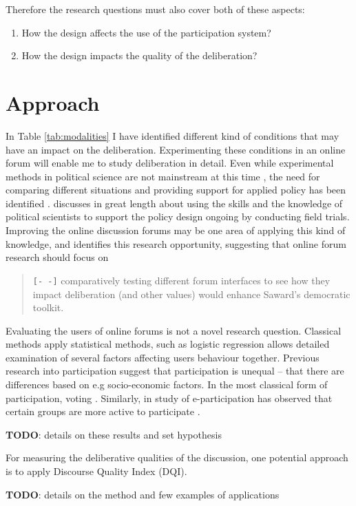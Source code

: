\documentclass[journal,a4paper]{IEEEtran}
\begin{document}
Therefore the research questions must also cover both of these aspects:

\begin{enumerate}
\item How the design affects the use of the participation system?
\item How the design impacts the quality of the deliberation?
\end{enumerate}

\section{Approach}

In Table \ref{tab:modalities} I have identified different kind of conditions that may have an impact on the deliberation. Experimenting these conditions in an online forum will enable me to study deliberation in detail. Even while experimental methods in political science are not mainstream at this time \cite{green03,druckman06}, the need for comparing different situations and providing support for applied policy has been identified \cite{stoker10}.  discusses in great length about using the skills and the knowledge of political scientists to support the policy design ongoing by conducting field trials. Improving the online discussion forums may be one area of applying this kind of knowledge, and  identifies this research opportunity, suggesting that online forum research should focus on

\begin{quote}
\texttt{[- -]} comparatively testing different forum interfaces to see how they impact deliberation (and other values) would 
enhance Saward’s democratic toolkit.
\end{quote}

Evaluating the users of online forums is not a novel research question. Classical methods apply statistical methods, such as logistic regression allows detailed examination of several factors affecting users behaviour together. Previous research into participation suggest that participation is unequal -- that there are differences based on e.g socio-economic factors. In the most classical form of participation, voting . Similarly, in study of e-participation has observed that certain groups are more active to participate \cite{albrecht06,strandberg08}.

\textbf{TODO}: details on these results and set hypothesis

For measuring the deliberative qualities of the discussion, one potential approach is to apply  Discourse Quality Index (DQI).

\textbf{TODO}: details on the method and few examples of applications



\end{document}
